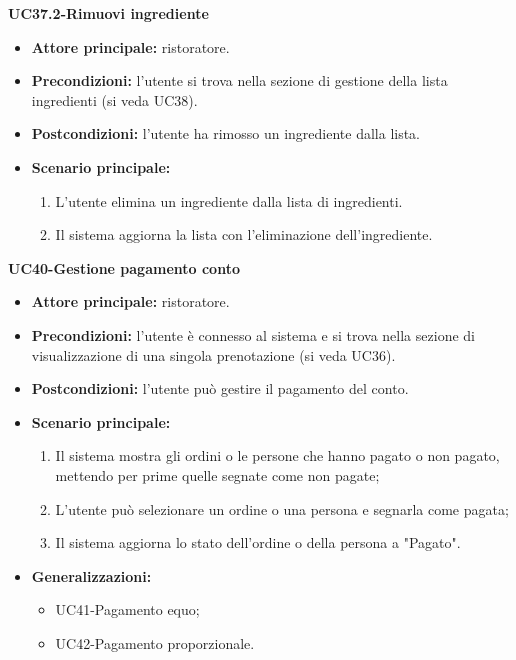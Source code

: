 \textbf{UC37.2-Rimuovi ingrediente}  
\begin{itemize}
    \item \textbf{Attore principale:} ristoratore.
    \item \textbf{Precondizioni:} l'utente si trova nella sezione di gestione della lista ingredienti (si veda UC38).
    \item \textbf{Postcondizioni:} l'utente ha rimosso un ingrediente dalla lista.
    \item \textbf{Scenario principale:}
    \begin{enumerate}
        \item L'utente elimina un ingrediente dalla lista di ingredienti.
        \item Il sistema aggiorna la lista con l'eliminazione dell'ingrediente.
    \end{enumerate}
\end{itemize}


\textbf{UC40-Gestione pagamento conto}  
\begin{itemize}
    \item \textbf{Attore principale:} ristoratore.
    \item \textbf{Precondizioni:} l'utente è connesso al sistema e si trova nella sezione di visualizzazione di una singola prenotazione (si veda UC36).
    \item \textbf{Postcondizioni:} l'utente può gestire il pagamento del conto.
    \item \textbf{Scenario principale:}
    \begin{enumerate}
        \item Il sistema mostra gli ordini o le persone che hanno pagato o non pagato, mettendo per prime quelle segnate come non pagate;
        \item L'utente può selezionare un ordine o una persona e segnarla come pagata;
        \item Il sistema aggiorna lo stato dell'ordine o della persona a "Pagato".
    \end{enumerate}
    \item \textbf{Generalizzazioni:}
        \begin{itemize}
            \item UC41-Pagamento equo;
            \item UC42-Pagamento proporzionale.
        \end{itemize}
\end{itemize}

